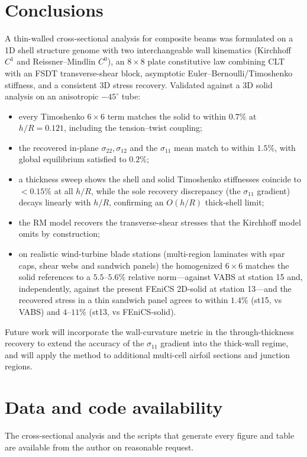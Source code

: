 \documentclass[preprint,12pt]{elsarticle}
\newcommand{\hR}{h/R}
\begin{document}
\section{Conclusions}
A thin-walled cross-sectional analysis for composite beams was formulated on a
1D shell structure genome with two interchangeable wall kinematics (Kirchhoff
$C^{1}$ and Reissner--Mindlin $C^{0}$), an $8\times8$ plate constitutive law
combining CLT with an FSDT transverse-shear block, asymptotic
Euler--Bernoulli/Timoshenko stiffness, and a consistent 3D stress recovery.
Validated against a 3D solid analysis on an anisotropic $-45^{\circ}$ tube:
\begin{itemize}
\item every Timoshenko $6\times6$ term matches the solid to within $0.7\%$ at
$\hR=0.121$, including the tension--twist coupling;
\item the recovered in-plane $\sigma_{22},\sigma_{12}$ and the $\sigma_{11}$
mean match to within $1.5\%$, with global equilibrium satisfied to $0.2\%$;
\item a thickness sweep shows the shell and solid Timoshenko stiffnesses
coincide to $<0.15\%$ at all $\hR$, while the sole recovery discrepancy (the
$\sigma_{11}$ gradient) decays linearly with $\hR$, confirming an $O(\hR)$
thick-shell limit;
\item the RM model recovers the transverse-shear stresses that the Kirchhoff
model omits by construction;
\item on realistic wind-turbine blade stations (multi-region laminates with
spar caps, shear webs and sandwich panels) the homogenized $6\times6$ matches
the solid references to a $5.5$--$5.6\%$ relative norm---against VABS at
station 15 and, independently, against the present FEniCS 2D-solid at
station 13---and the recovered stress in a thin sandwich panel agrees to within
$1.4\%$ (st15, vs VABS) and $4$--$11\%$ (st13, vs FEniCS-solid).
\end{itemize}
Future work will incorporate the wall-curvature metric in the through-thickness
recovery to extend the accuracy of the $\sigma_{11}$ gradient into the
thick-wall regime, and will apply the method to additional multi-cell airfoil
sections and junction regions.

\section*{Data and code availability}
The cross-sectional analysis and the scripts that generate every figure and
table are available from the author on reasonable request.
\end{document}
